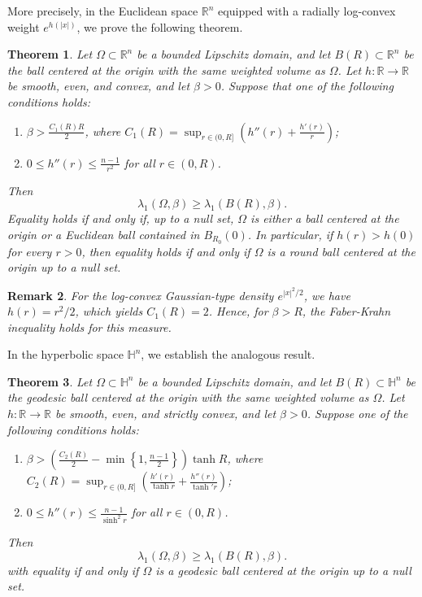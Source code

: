\documentclass[11pt,leqno]{amsart}
\newtheorem{theorem}{Theorem}[section]\newtheorem{thm}[theorem]{Theorem}
\newtheorem{remark}[theorem]{Remark}
\def\R{\mathbb{R}}
\numberwithin{equation}{section}
\begin{document}
More precisely, in the Euclidean space $\R^n$ equipped with a radially log-convex weight $e^{h(|x|)}$, we prove the following theorem.
\begin{theorem}\label{Euclidean log convex}
    Let $\Omega\subset \mathbb{R}^n$ be a bounded Lipschitz domain, and let $B(R)\subset \mathbb{R}^{n}$ be the ball centered at the origin with the same weighted volume as $\Omega$. Let
    \(h\colon\R\to\R\) be smooth, even, and convex, and let \(\beta>0\). Suppose that one of the following conditions holds:
    \begin{enumerate}
        \item[\textup{(i)}] $\beta > \frac{C_{1}(R)R}{2}$, where $C_{1}(R)=\sup_{r\in (0,R]} \left(h''(r) + \frac{h'(r)}{r}\right)$;
        \item[\textup{(ii)}] $0 \leq h''(r) \leq \frac{n-1}{r^2}$ for all $r \in (0,R)$.
    \end{enumerate}
    Then
   \begin{equation}\label{eq:Euclidean-FK}
   	\lambda_1(\Omega,\beta)
   	\geq \lambda_1(B(R),\beta).
   \end{equation}
   Equality holds if and only if, up to a null set, \(\Omega\) is either
   a ball centered at the origin or a Euclidean ball contained in
   \(B_{R_0}(0)\).  In particular, if \(h(r)>h(0)\) for every \(r>0\),
   then equality holds if and only if \(\Omega\) is a round ball centered at the origin up to a null set.
\end{theorem}

\begin{remark}
    For the log-convex Gaussian-type density \(e^{|x|^2/2}\),  we have $h(r) = r^2/{2}$, which yields $C_{1}(R)=2$. Hence, for $\beta>R$, the Faber-Krahn  inequality holds for this measure.
\end{remark}

In the hyperbolic space $\mathbb{H}^n$, we establish the analogous result.
\begin{theorem}\label{Hyperbolic space with log convex}
    Let $\Omega\subset \mathbb{H}^n$ be a bounded Lipschitz domain, and let $B(R)\subset \mathbb{H}^{n}$ be the geodesic ball centered at the origin with the same weighted volume as $\Omega$.  Let
    \(h\colon\R\to\R\) be smooth, even, and strictly convex, and let
    \(\beta>0\). 
    Suppose one of the following conditions holds:
    \begin{enumerate}
        \item[\textup{(i)}]  $\beta > \left(\frac{C_{2}(R)}{2}-\min\left\{1,\frac{n-1}{2}\right\}\right)\tanh R$, where $C_{2}(R)=\sup_{r\in (0,R]}\left(\frac{h'(r)}{\tanh r}+\frac{h''(r)}{\tanh' r}\right)$;
        \item[\textup{(ii)}] $0 \leq h''(r) \leq \frac{n-1}{\sinh^2 r}$ for all $r \in (0,R)$.
    \end{enumerate}
Then
\begin{equation}\label{eq:Hyperbolic-FK}
    	\lambda_1(\Omega,\beta)
    	\geq\lambda_1(B(R),\beta).
    \end{equation}
   with equality if and only if $\Omega$ is a geodesic ball centered at the origin up to a null set.

\end{theorem}
\end{document}
